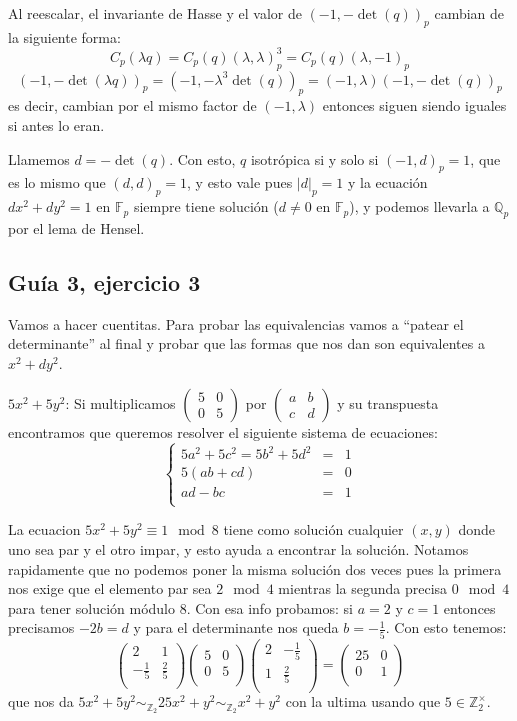 \documentclass[12pt]{amsart}
\newcommand{\QQ}{\mathbb{Q}}
\newcommand{\ZZ}{\mathbb{Z}}
\newcommand{\FF}{\mathbb{F}}
\newcommand{\minimat}[4]{\left(\begin{smallmatrix} #1 & #2 \\ #3 & #4 
\end{smallmatrix}\right)}
\newcommand{\lp}{\left(}
\newcommand{\rp}{\right)}
\theoremstyle{plain}
\begin{document}
Al reescalar, el invariante de Hasse y el valor de $(-1,-\det(q))_p$ 
cambian de la siguiente forma:
$$C_p(\lambda q) = C_p(q) (\lambda,\lambda)_p^3 = C_p(q) 
(\lambda, -1)_p$$
$$(-1,-\det(\lambda q))_p = (-1,-\lambda^3\det(q))_p=
(-1,\lambda)(-1,-\det(q))_p$$
es decir, cambian por el mismo factor de $(-1,\lambda)$ entonces siguen
siendo iguales si antes lo eran.

Llamemos $d = -\det (q)$. Con esto, $q$ isotrópica si y solo si 
$(-1,d)_p =1$, que es lo mismo que $(d,d)_p =1$, y esto vale
pues $|d|_p =1$ y la ecuación $d x^2 + d y^2 = 1$ en 
$\FF_p$ siempre tiene solución ($d\neq 0$ en $\FF_p$), y
podemos llevarla a $\QQ_p$ por el lema de Hensel.

\subsection*{Guía 3, ejercicio 3} Vamos a hacer cuentitas. Para
probar las equivalencias vamos a ``patear el determinante'' al final
y probar que las formas que nos dan son equivalentes a $x^2+dy^2$.

$5x^2+5y^2$: Si multiplicamos $\minimat{5}{0}{0}{5}$ por 
$\minimat{a}{b}{c}{d}$ y su transpuesta encontramos que queremos 
resolver el siguiente sistema de ecuaciones:
$$\left\{
\begin{matrix}
    5a^2+5c^2=5b^2+5d^2 &=&1 \\
    5(ab+cd) &=&0 \\
    ad-bc &=&1 \\
\end{matrix}\right.$$

La ecuacion $5x^2+5y^2\equiv 1\mod 8$ tiene como solución cualquier
$(x,y)$ donde uno sea par y el otro impar, y esto ayuda a encontrar 
la solución. Notamos rapidamente que no podemos poner la misma 
solución dos veces pues la primera nos exige que el elemento par sea
$2\mod4$ mientras la segunda precisa $0\mod4$ para tener solución 
módulo 8. Con esa info probamos: si $a=2$ y $c=1$ entonces 
precisamos $-2b=d$ y para el determinante nos queda $b=-\frac{1}{5}$.
Con esto tenemos:
$$\lp\begin{matrix}
    2&1 \\
    -\frac{1}{5}&\frac{2}{5} \\
\end{matrix}\rp
\lp\begin{matrix}
    5&0 \\
    0&5 \\
\end{matrix}\rp
\lp\begin{matrix}
    2&-\frac{1}{5} \\
    1&\frac{2}{5} \\
\end{matrix}\rp = 
\lp\begin{matrix}
    25&0 \\
    0&1 \\
\end{matrix}\rp$$
que nos da $5x^2+5y^2\sim_{\ZZ_2} 25x^2+y^2 \sim_{\ZZ_2} x^2+y^2$ 
con la ultima usando que $5\in \ZZ_2^\times$.
\end{document}
